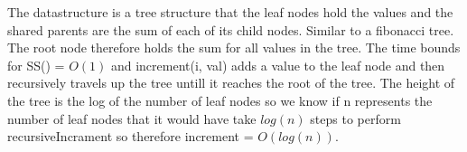\documentclass[11pt]{article}
\begin{document}
        The datastructure is a tree structure that the leaf nodes hold the values and the shared parents are the sum of each of its
        child nodes. Similar to a fibonacci tree. The root node therefore holds the sum for all values in the tree. 
        The time bounds for SS() = $ O(1) $ and increment(i, val) adds a value to the leaf node and then recursively
        travels up the tree untill it reaches the root of the tree. The height of the tree is the log of the number of leaf nodes
        so we know if n represents the number of leaf nodes that it would have take $ log(n) $ steps to perform recursiveIncrament so 
        therefore increment = $ O(log(n)) $.

    
\end{document}
